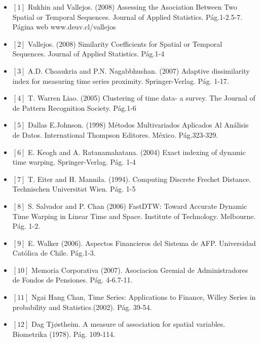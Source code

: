 \def\baselinestretch{1.0}
\medskip


\begin{itemize}
\item $[1]$ Rukhin and Vallejos. (2008) Assessing the Asociation Between Two Spatial or Temporal Sequences. Journal of Applied Statistics. P\'ag.1-2.5-7.  P\'agina web www.deuv.cl/vallejos
\item $[2]$ Vallejos. (2008) Similarity Coefficients for Spatial or Temporal Sequences. Journal of A\-ppli\-ed Statistics. P\'ag.1-4
\item $[3]$ A.D. Choaukria and P.N. Nagabbhushan. (2007) Adaptive dissimilarity index for mea\-su\-ring time series proximity. Springer-Verlag. P\'ag. 1-17.
\item $[4]$ T. Warren Liao. (2005) Clustering of time data- a survey. The Journal of de Pattern Recognition Society. P\'ag.1-6
\item $[5]$ Dallas E.Johnson. (1998) M\'etodos Multivariados Aplicados Al An\'alisis de Datos. International Thompson Editores. M\'exico. P\'ag.323-329.
\item $[6]$ E. Keogh and A. Ratanamahatana. (2004) Exact indexing of dynamic time warping. Springer-Verlag. P\'ag. 1-4
\item $[7]$ T. Eiter and H. Mannila. (1994). Computing Discrete Frechet Distance. Technischen Universit$\ddot{a}$t Wien. P\'ag. 1-5
\item $[8]$ S. Salvador and P. Chan (2006) FastDTW: Toward Accurate Dynamic Time Warping in Linear Time and Space. Institute of Technology. Melbourne. P\'ag. 1-2.
\item $[9]$ E. Walker (2006). Aspectos Financieros del Sistema de AFP. Universidad Cat\'olica de Chile. P\'ag.1-3.
\item $[10]$ Memoria Corporativa (2007). Asociacion Gremial de Administradores de Fondos de Pensiones. P\'ag. 4-6.7-11.
\item $[11]$ Ngai Hang Chan, Time Series: Applications to Finance, Willey Series in probability and Statistics.(2002). P\'ag. 39-54.
\item $[12]$ Dag Tj$\phi$stheim. A measure of association for spatial variables. Biometrika (1978). P\'ag. 109-114.
\end{itemize}

